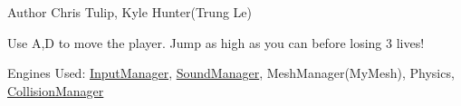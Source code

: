 \begin{DoxyAuthor}{Author}
Chris Tulip, Kyle Hunter(\+Trung Le)
\end{DoxyAuthor}
Use A,D to move the player. Jump as high as you can before losing 3 lives!

Engines Used\+: \mbox{\hyperlink{class_input_manager}{Input\+Manager}}, \mbox{\hyperlink{class_sound_manager}{Sound\+Manager}}, Mesh\+Manager(\+My\+Mesh), Physics, \mbox{\hyperlink{class_collision_manager}{Collision\+Manager}} 